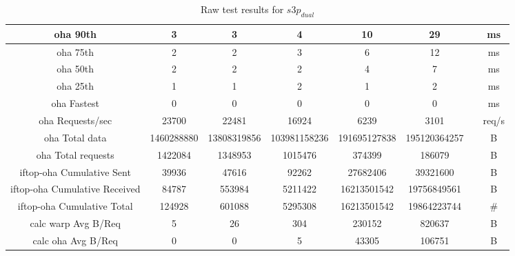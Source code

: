 \begin{sidewaystable}
\begin{tabular}{|c|c|c|c|c|c|c|c|}
		\hline
		oha 90th & 3 & 3 & 4 & 10 & 29 &  & ms \\
		\hline
		oha 75th & 2 & 2 & 3 & 6 & 12 &  & ms \\
		\hline
		oha 50th & 2 & 2 & 2 & 4 & 7 &  & ms \\
		\hline
		oha 25th & 1 & 1 & 2 & 1 & 2 &  & ms \\
		\hline
		oha Fastest & 0 & 0 & 0 & 0 & 0 &  & ms \\
		\hline
		oha Requests/sec & 23700 & 22481 & 16924 & 6239 & 3101 &  & req/s \\
		\hline
		oha Total data & 1460288880 & 13808319856 & 103981158236 & 191695127838 & 195120364257 &  & B \\
		\hline
		oha Total requests & 1422084 & 1348953 & 1015476 & 374399 & 186079 &  & B \\
		\hline
		iftop-oha Cumulative Sent & 39936 & 47616 & 92262 & 27682406 & 39321600 &  & B \\
		\hline
		iftop-oha Cumulative Received & 84787 & 553984 & 5211422 & 16213501542 & 19756849561 &  & B \\
		\hline
		iftop-oha Cumulative Total & 124928 & 601088 & 5295308 & 16213501542 & 19864223744 &  & \# \\
		\hline
		calc warp Avg B/Req & 5 & 26 & 304 & 230152 & 820637 &  & B \\
		\hline
		calc oha Avg B/Req & 0 & 0 & 5 & 43305 & 106751 &  & B \\
		\hline
	\end{tabular}
	\caption{Raw test results for ${s3p}_{dual}$}
\end{sidewaystable}

